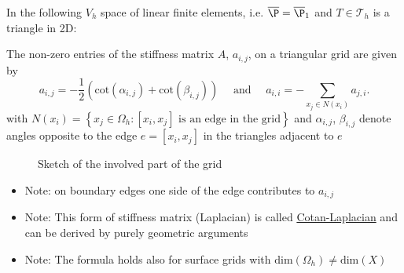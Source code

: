 In the following $V_{h}$ space of linear finite elements, i.e. $\overline{\P}= \overline{\P}_{1}$ and $T \in\mathcal{T}_{h}$ is a triangle in 2D:

\begin{lemma}
\label{thm:stiffnessmatrixlemma}
	The non-zero entries of the stiffness matrix $A$, $a_{i,j}$, on a triangular grid are given by
	\[
		a_{i,j} = -\frac{1}{2}(\text{cot}(\alpha_{i,j}) + \text{cot}(\beta_{i,j})) \quad\text{ and }\quad a_{i,i} = -\sum_{x_{j}\in N(x_{i})}^{}{a_{j,i}}
	.\] 
	with $N(x_{i})=\left\{ x_{j} \in \Omega _{h} : \left[ x_{i},x_{j}\right] \text{ is an edge in the grid}   \right\} $ and $\alpha_{i,j}$, $\beta_{i,j}$ denote angles opposite to the edge $e=[x_{i}, x_{j}]$ in the triangles adjacent to $e$

	\begin{figure}[H]
		\begin{center}
			
		\end{center}
		\caption{Sketch of the involved part of the grid}
		\label{fig:pentagonrelations}
	\end{figure}
	

	\begin{itemize}
	\item Note: on boundary edges one side of the edge contributes to $a_{i,j}$
	\item Note: This form of stiffness matrix (Laplacian) is called \underline{Cotan-Laplacian} and can be derived by purely geometric arguments
	\item Note: The formula holds also for surface grids with $\text{dim}(\Omega _{h}) \neq \text{dim}(X)$
\end{itemize}

\end{lemma}

